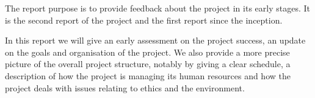 The report purpose is to provide feedback about the project in its early stages. It is the second report of the project and the first report since the inception.

In this report we will give an early assessment on the project success, an update on the goals and organisation of the project. We also provide a more precise picture of the overall project structure, notably by giving a clear schedule, a description of how the project is managing its human resources and how the project deals with issues relating to ethics and the environment.
